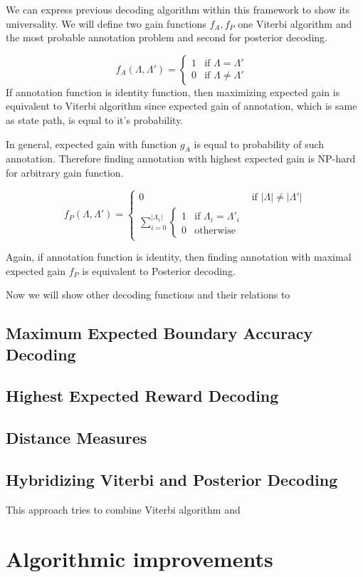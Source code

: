 We can express previous decoding algorithm within this framework to show
its universality. We will define two gain functions $f_A, f_P$ one 
Viterbi algorithm and the most probable annotation problem and second for
posterior decoding.

\begin{equation}
f_A(\Lambda,\Lambda') = \begin{cases}
1 & \text{if $\Lambda = \Lambda'$ }\\
0 & \text{if $\Lambda \not=\Lambda'$}
\end{cases}
\end{equation}
If annotation function is identity function, then maximizing expected gain is 
equivalent to Viterbi algorithm since expected gain of annotation, which is
same as state path, is equal to it's probability.

In general, expected gain with function $g_A$ is equal to probability of such
annotation. Therefore finding annotation with highest expected gain is NP-hard
for arbitrary gain function.

\begin{equation}
f_P(\Lambda,\Lambda') = 
\begin{cases}
0 & \text{if $|\Lambda|\not=|\Lambda'|$}\\
\sum_{i=0}^{|\Lambda_1|}\begin{cases}
1 & \text{if $\Lambda_i=\Lambda'_i$}\\
0 & \text{otherwise}
\end{cases}
\end{cases}
\end{equation}

Again, if annotation function is identity, then finding annotation with maximal
expected gain $f_P$ is equivalent to Posterior decoding. 

Now we will show other decoding functions and their relations to

\subsection{Maximum Expected Boundary Accuracy Decoding}

\subsection{Highest Expected Reward Decoding}

\subsection{Distance Measures}

\subsection{Hybridizing Viterbi and Posterior Decoding}

This approach tries to combine Viterbi algorithm and 


\section{Algorithmic improvements}












